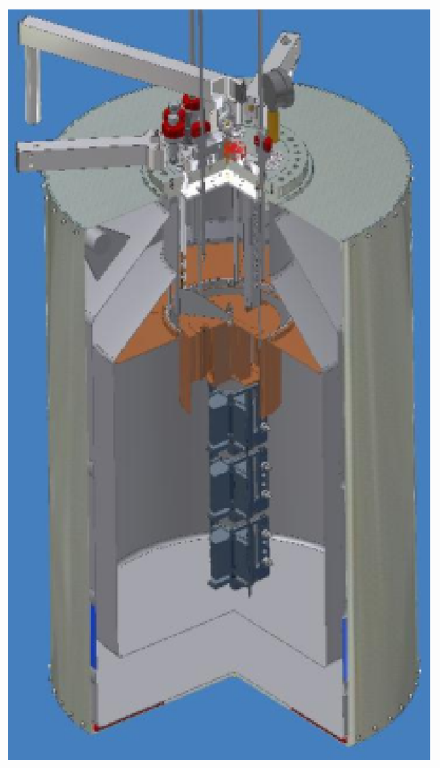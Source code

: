 \begin{figure}[tbhp]
  \centering
  \includegraphics[height=0.25\textheight]{GIIdraw}\hfil

\end{figure}
